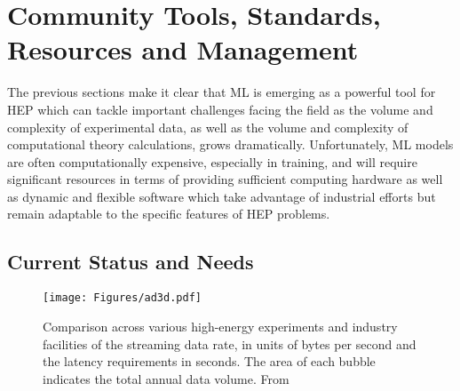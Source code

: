 \documentclass[submission,Phys]{SciPost}
\begin{document}





\section{Community Tools, Standards, Resources and Management}
\label{sec:communitytools}

The previous sections make it clear that ML is emerging as a powerful tool for HEP which can tackle important challenges facing the field as the volume and complexity of experimental data, as well as the volume and complexity of computational theory calculations, grows dramatically. Unfortunately, ML models are often computationally expensive, especially in training, and will require significant resources in terms of providing sufficient computing hardware as well as  dynamic and flexible software which take advantage of industrial efforts but remain adaptable to the specific features of HEP problems. 

\subsection{Current Status and Needs}

\begin{figure}
    \centering
    \texttt{[image: Figures/ad3d.pdf]}
    \caption{Comparison across various high-energy experiments and industry facilities of the streaming data rate, in units of bytes per second and the latency requirements in seconds.  The area of each bubble indicates the total annual data volume. From~\cite{Harris:2022qtm}}
    \label{fig:compf3latency}
\end{figure}
\end{document}
